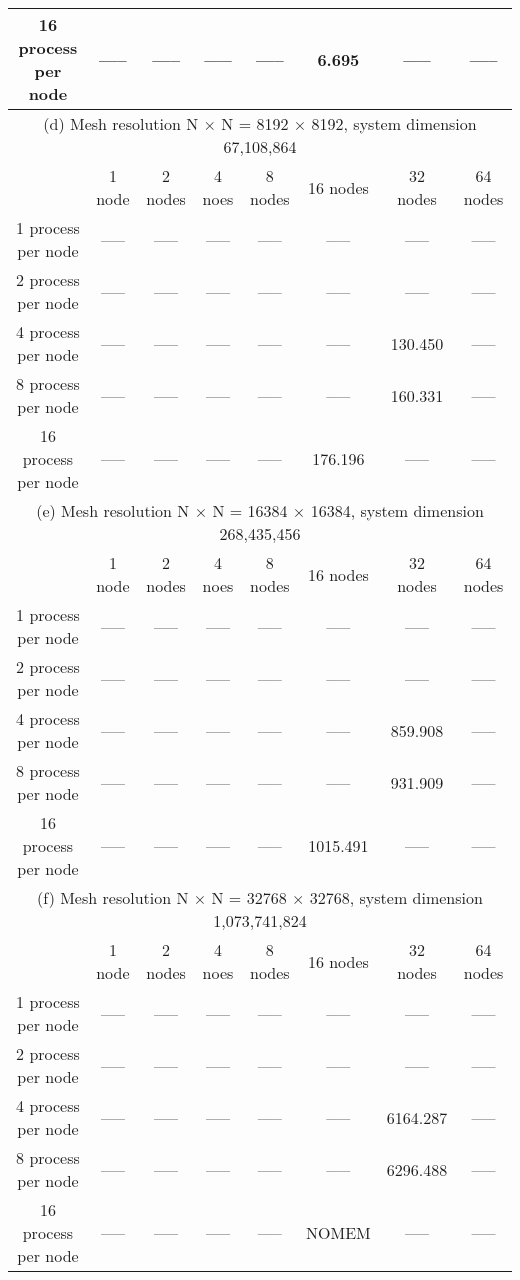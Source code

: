 \documentclass[11pt]{article}
\begin{document}
\begin{table}[!htbp]
{\begin{tabular}{ |c|c|c|c|c|c|c|c|  }
16 process per node & ----- & ----- & ----- & ----- & 6.695 & ----- & ----- \\
\hline
\hline
\multicolumn{8}{|c|}{(d) Mesh resolution N $\times$ N = 8192 $\times$ 8192, system dimension 67,108,864}\\
\hline
 & 1 node & 2 nodes & 4 noes & 8 nodes & 16 nodes & 32 nodes & 64 nodes \\
\hline
1 process per node  & ----- & ----- & ----- & ----- & ----- & ----- & ----- \\
2 process per node  & ----- & ----- & ----- & ----- & ----- & ----- & ----- \\
4 process per node  & ----- & ----- & ----- & ----- & ----- & 130.450 & ----- \\
8 process per node  & ----- & ----- & ----- & ----- & ----- & 160.331 & ----- \\
16 process per node & ----- & ----- & ----- & ----- & 176.196 & ----- & ----- \\
\hline
\hline
\multicolumn{8}{|c|}{(e) Mesh resolution N $\times$ N = 16384 $\times$ 16384, system dimension 268,435,456}\\
\hline
 & 1 node & 2 nodes & 4 noes & 8 nodes & 16 nodes & 32 nodes & 64 nodes \\
\hline
1 process per node  & ----- & ----- & ----- & ----- & ----- & ----- & ----- \\
2 process per node  & ----- & ----- & ----- & ----- & ----- & ----- & ----- \\
4 process per node  & ----- & ----- & ----- & ----- & ----- & 859.908 & ----- \\
8 process per node  & ----- & ----- & ----- & ----- & ----- & 931.909 & ----- \\
16 process per node & ----- & ----- & ----- & ----- & 1015.491 & ----- & ----- \\
\hline
\hline
\multicolumn{8}{|c|}{(f) Mesh resolution N $\times$ N = 32768 $\times$ 32768, system dimension 1,073,741,824}\\
\hline
 & 1 node & 2 nodes & 4 noes & 8 nodes & 16 nodes & 32 nodes & 64 nodes \\
\hline
1 process per node  & ----- & ----- & ----- & ----- & ----- & ----- & ----- \\
2 process per node  & ----- & ----- & ----- & ----- & ----- & ----- & ----- \\
4 process per node  & ----- & ----- & ----- & ----- & ----- & 6164.287 & ----- \\
8 process per node  & ----- & ----- & ----- & ----- & ----- & 6296.488 & ----- \\
16 process per node & ----- & ----- & ----- & ----- & NOMEM & ----- & ----- \\
\hline
\end{tabular}
}
\end{table}
\pagebreak
\pagebreak
\end{document}
